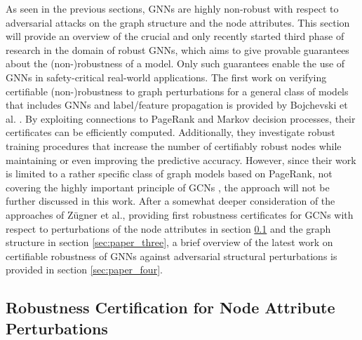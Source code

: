 \documentclass[a4paper,preprint]{sig-alternate}
\begin{document}
As seen in the previous sections, GNNs are highly non-robust with respect to adversarial attacks on the graph
structure and the node attributes. This section will provide an overview of the crucial and only recently started 
third phase of research in the domain of robust GNNs, which aims to give provable guarantees about the (non-)robustness of a model.
Only such guarantees enable the use of GNNs in safety-critical real-world applications.\newline
The first work on verifying certifiable (non-)robustness to graph perturbations for a general class of models that includes GNNs and label/feature
propagation is provided by Bojchevski et al. \cite{bojchevski2019certifiable}. By exploiting connections to PageRank and Markov decision processes,
their certificates can be efficiently computed. Additionally, they investigate robust training procedures that increase the number of certifiably
robust nodes while maintaining or even improving the predictive accuracy. However, since their work is limited to a rather specific class of 
graph models based on PageRank, not covering the highly important principle of GCNs \cite{10.1145/3394486.3403217}, the approach will not be further 
discussed in this work.\newline
After a somewhat deeper consideration of the approaches of Zügner et al., providing first robustness certificates for GCNs with respect to 
perturbations of the node attributes in section \ref{sec:paper_two} and the graph structure in section \ref{sec:paper_three},
a brief overview of the latest work on certifiable robustness of GNNs against adversarial structural perturbations is provided 
in section \ref{sec:paper_four}.

\subsection{Robustness Certification for Node Attribute Perturbations}
\label{sec:paper_two}
\end{document}
